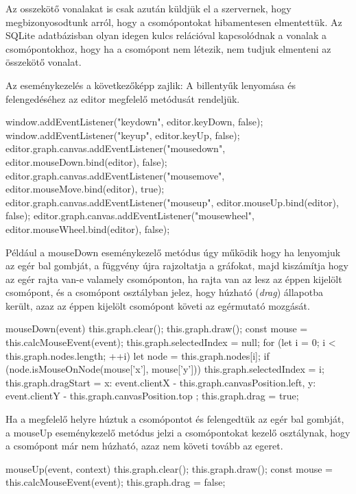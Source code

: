 Az osszekötő vonalakat is csak azután küldjük el a szervernek, hogy megbizonyosodtunk arról, hogy a csomópontokat hibamentesen elmentettük. Az SQLite adatbázisban olyan idegen kulcs relációval kapcsolódnak a vonalak a csomópontokhoz, hogy ha a csomópont nem létezik, nem tudjuk elmenteni az összekötő vonalat.
 
Az eseménykezelés a következőképp zajlik: A billentyűk lenyomása és felengedéséhez az editor megfelelő metódusát rendeljük.

\begin{javascript}
window.addEventListener("keydown", editor.keyDown, false);
window.addEventListener("keyup", editor.keyUp, false);
editor.graph.canvas.addEventListener("mousedown", editor.mouseDown.bind(editor), false);
editor.graph.canvas.addEventListener("mousemove", editor.mouseMove.bind(editor), true);
editor.graph.canvas.addEventListener("mouseup", editor.mouseUp.bind(editor), false);
editor.graph.canvas.addEventListener("mousewheel", editor.mouseWheel.bind(editor), false);
\end{javascript}
 
Például a mouseDown eseménykezelő metódus úgy működik hogy ha lenyomjuk az egér bal gombját, a függvény újra rajzoltatja a gráfokat, majd kiszámítja hogy az egér rajta van-e valamely csomóponton, ha rajta van az lesz az éppen kijelölt csomópont, és a csomópont osztályban jelez, hogy húzható (\textit{drag}) állapotba került, azaz az éppen kijelölt csomópont követi az egérmutató mozgását.

\begin{javascript}
mouseDown(event)
{
   this.graph.clear();
   this.graph.draw();
   const mouse = this.calcMouseEvent(event);
   this.graph.selectedIndex = null;
   for (let i = 0; i < this.graph.nodes.length; ++i) {
       let node = this.graph.nodes[i];
       if (node.isMouseOnNode(mouse['x'], mouse['y'])){
           this.graph.selectedIndex = i;
       }
   }
   this.graph.dragStart = {
       x: event.clientX - this.graph.canvasPosition.left,
       y: event.clientY - this.graph.canvasPosition.top
   };
   this.graph.drag = true;
}
\end{javascript}

 
Ha a megfelelő helyre húztuk a csomópontot és felengedtük az egér bal gombját, a mouseUp eseménykezelő metódus jelzi a csomópontokat kezelő osztálynak, hogy a csomópont már nem húzható, azaz nem követi tovább az egeret.

\begin{javascript}
mouseUp(event, context)
{
   this.graph.clear();
   this.graph.draw();
   const mouse = this.calcMouseEvent(event);
   this.graph.drag = false;
}
\end{javascript}

